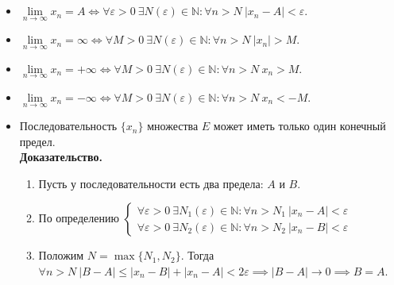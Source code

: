 \documentclass{article}
\begin{document}
\section{\centering}
\noindent{}
\begin{itemize}
    \item \(\lim\limits_{n \to \infty} x_n = A \iff \forall \varepsilon > 0\ \exists N(\varepsilon) \in \mathbb{N}: \forall n > N\ \left\vert x_n - A \right\vert < \varepsilon\).
    \item \(\lim\limits_{n \to \infty} x_n = \infty \iff \forall M > 0\ \exists N(\varepsilon) \in \mathbb{N}: \forall n > N\ \left\vert x_n \right\vert > M\).
    \item \(\lim\limits_{n \to \infty} x_n = +\infty \iff \forall M > 0\ \exists N(\varepsilon) \in \mathbb{N}: \forall n > N\ x_n > M\).
    \item \(\lim\limits_{n \to \infty} x_n = -\infty \iff \forall M > 0\ \exists N(\varepsilon) \in \mathbb{N}: \forall n > N\ x_n < -M\).
    \item Последовательность \(\{x_n\}\) множества \(E\) может иметь только один конечный предел.\\
    \textbf{Доказательство.}
    \begin{enumerate}
        \item Пусть у последовательности есть два предела: \(A\) и \(B\).
        \item По определению
        \(\begin{cases}
            \forall \varepsilon > 0\ \exists N_1(\varepsilon) \in \mathbb{N}: \forall n > N_1\ \left\vert x_n - A \right\vert < \varepsilon\\
            \forall \varepsilon > 0\ \exists N_2(\varepsilon) \in \mathbb{N}: \forall n > N_2\ \left\vert x_n - B \right\vert < \varepsilon
        \end{cases}\)
        \item Положим \(N = \max\{N_1, N_2\}\). Тогда \(\forall n > N\ \left\vert B - A \right\vert \leq \left\vert x_n - B \right\vert + \left\vert x_n - A \right\vert < 2\varepsilon \implies \left\vert B - A \right\vert \to 0 \implies B = A\).  

\end{enumerate}
\end{itemize}
\end{document}
